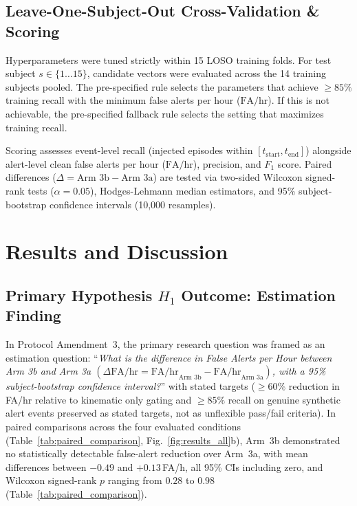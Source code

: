 \documentclass[conference]{IEEEtran}
\begin{document}
\subsection{Leave-One-Subject-Out Cross-Validation \& Scoring}
Hyperparameters were tuned strictly within 15 LOSO training folds. For test subject $s \in \{1\dots 15\}$, candidate vectors were evaluated across the 14 training subjects pooled. The pre-specified rule selects the parameters that achieve $\ge 85\%$ training recall with the minimum false alerts per hour ($\text{FA/hr}$). If this is not achievable, the pre-specified fallback rule selects the setting that maximizes training recall.

Scoring assesses event-level recall (injected episodes within $[t_{\text{start}}, t_{\text{end}}]$) alongside alert-level clean false alerts per hour ($\text{FA/hr}$), precision, and $F_1$ score. Paired differences ($\Delta = \text{Arm 3b} - \text{Arm 3a}$) are tested via two-sided Wilcoxon signed-rank tests ($\alpha = 0.05$), Hodges-Lehmann median estimators, and 95\% subject-bootstrap confidence intervals (10,000 resamples).

\section{Results and Discussion}
\subsection{Primary Hypothesis $H_1$ Outcome: Estimation Finding}
In Protocol Amendment~3, the primary research question was framed as an estimation question: ``\emph{What is the difference in False Alerts per Hour between Arm 3b and Arm 3a $(\Delta\text{FA/hr} = \text{FA/hr}_{\text{Arm 3b}} - \text{FA/hr}_{\text{Arm 3a}})$, with a 95\% subject-bootstrap confidence interval?}'' with stated targets ($\ge 60\%$ reduction in FA/hr relative to kinematic only gating and $\ge 85\%$ recall on genuine synthetic alert events preserved as stated targets, not as unflexible pass/fail criteria). In paired comparisons across the four evaluated conditions (Table~\ref{tab:paired_comparison}, Fig.~\ref{fig:results_all}b), Arm~3b demonstrated no statistically detectable false-alert reduction over Arm~3a, with mean differences between $-0.49$ and $+0.13$\,FA/h, all 95\% CIs including zero, and Wilcoxon signed-rank $p$ ranging from $0.28$ to $0.98$ (Table~\ref{tab:paired_comparison}).



\end{document}
